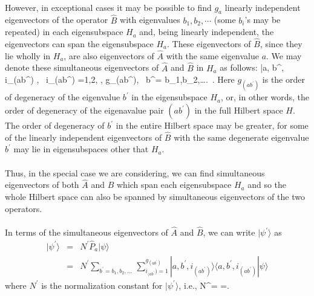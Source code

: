 \paragraph{}
However, in exceptional cases it may be possible to find $g_a$ linearly independent eigenvectors of the operator $\hat{B}$
with  eigenvalues $b_1, b_2, \cdots$ (some $b_i$'s may be repeated) in each eigensubspace $H_{a}$ and, being  linearly independent, the eigenvectors can span the eigensubspace $H_a$. These eigenvectors of $\hat{B}$, since they lie wholly in $H_{a}$, are also eigenvectors of $\hat{A}$ with the same eigenvalue $a$. We may denote these simultaneous eigenvectors
of $\hat{A}$ and $\hat{B}$ in $H_a$ as follows:
\be
|a, b^{\prime}, i_{(ab^{\prime})} \rangle, \, i_{(ab^{\prime})} =1,2, \cdots , g_{(ab^{\prime})}, \, b^{\prime}= b_1,b_2,\ldots. \,. 
\label{aeq:simab}
\ee
Here $g_{(ab^{\prime})}$ is the order of degeneracy of the eigenvalue $b^{\prime}$ in the eigensubspace $H_a$, or, in other words, the order of degeneracy of the eigenavalue pair $(ab^{\prime})$ in the full Hilbert space $H$. The order of degeneracy of $b^{\prime}$ in the entire Hilbert space may be greater, for some of the linearly independent eigenvectors of $\hat{B}$  with the same degenerate eigenvalue  
$b^{\prime}$ may lie in eigensubspaces other that $H_a$. 

\paragraph{}
Thus, in the special case we are considering, we can find simultaneous eigenvectors of both $\hat{A}$ and $\hat{B}$ which span each eigensubspace $H_a$ and so the whole Hilbert space can also be spanned by simultaneous eigenvectors of the two operators. 

\paragraph{}
In terms of the simultaneous eigenvectors of $\hat{A}$ and $\hat{B}$, we can write $|\psi^{\prime}\rangle$ as
\begin{eqnarray}
|\psi^{\prime}\rangle &=& N^{\prime} \hat{P}_a |\psi\rangle \nonumber \\
&=&  N^{\prime} \sum_{b^{\prime}=b_1, b_2, \ldots}\,\sum_{i_{(ab^{\prime}})=1}^{g_{ (ab^{\prime})    }} |a,b^{\prime},i_{(ab^{\prime})}\rangle
\langle a,b^{\prime},i_{(ab^{\prime})}|\psi\rangle
\end{eqnarray}
where $N^{\prime}$ is the normalization constant for $|\psi^{\prime}\rangle$, i.e.,
\be
N^{\prime}= 
=.
\ee

